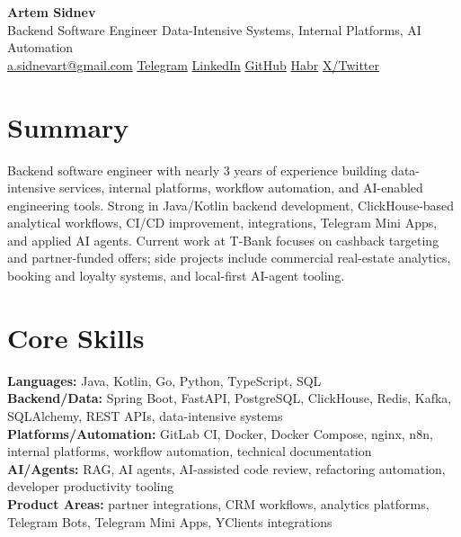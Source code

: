 \documentclass[10pt,a4paper]{article}
\begin{document}
\small

\begin{center}
{\LARGE \textbf{Artem Sidnev}}\\[0.20em]
{\normalsize Backend Software Engineer \textbar{} Data-Intensive Systems, Internal Platforms, AI Automation}\\[0.35em]
{\footnotesize
\href{mailto:a.sidnevart@gmail.com}{a.sidnevart@gmail.com}
\enspace\textbar\enspace
\href{https://t.me/sidnevart}{Telegram}
\enspace\textbar\enspace
\href{https://www.linkedin.com/in/artem-sidnev}{LinkedIn}
\enspace\textbar\enspace
\href{https://github.com/sidnevart}{GitHub}
\enspace\textbar\enspace
\href{https://habr.com/ru/users/sidnevart/}{Habr}
\enspace\textbar\enspace
\href{https://x.com/ArtemkaWeb3}{X/Twitter}
}
\end{center}

\vspace{0.04em}

\section*{Summary}
Backend software engineer with nearly 3 years of experience building data-intensive services, internal platforms, workflow automation, and AI-enabled engineering tools. Strong in Java/Kotlin backend development, ClickHouse-based analytical workflows, CI/CD improvement, integrations, Telegram Mini Apps, and applied AI agents. Current work at T-Bank focuses on cashback targeting and partner-funded offers; side projects include commercial real-estate analytics, booking and loyalty systems, and local-first AI-agent tooling.

\section*{Core Skills}
\textbf{Languages:} Java, Kotlin, Go, Python, TypeScript, SQL \\
\textbf{Backend/Data:} Spring Boot, FastAPI, PostgreSQL, ClickHouse, Redis, Kafka, SQLAlchemy, REST APIs, data-intensive systems \\
\textbf{Platforms/Automation:} GitLab CI, Docker, Docker Compose, nginx, n8n, internal platforms, workflow automation, technical documentation \\
\textbf{AI/Agents:} RAG, AI agents, AI-assisted code review, refactoring automation, developer productivity tooling \\
\textbf{Product Areas:} partner integrations, CRM workflows, analytics platforms, Telegram Bots, Telegram Mini Apps, YClients integrations
\end{document}
